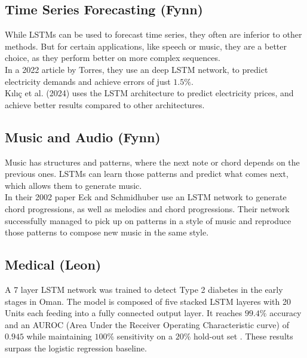 \documentclass[twoside,a4paper,10pt,DIV=12,BCOR=12mm]{scrartcl}
\begin{document}
\subsection{Time Series Forecasting (Fynn)}
While LSTMs can be used to forecast time series, they often are inferior to other methods.\cite{gers2001timeseries} But for certain applications, like speech or music, they are a better choice, as they perform better on more complex sequences.\cite{gers2001timeseries, cahuantzi2023lstmvsgru}\\
In a 2022 article by Torres, they use an deep LSTM network, to predict electricity demands and achieve errors of just \begin{math}1.5\%\end{math}.\cite{torres2022elctricityforecasting}\\
Kılıç et al. (2024) uses the LSTM architecture to predict electricity prices, and achieve better results compared to other architectures.\cite{nielsen2024electricitypriceforcasting}

\subsection{Music and Audio (Fynn)}
Music has structures and patterns, where the next note or chord depends on the previous ones. LSTMs can learn those patterns and predict what comes next, which allows them to generate music.\cite{eck2002musicgeneration}\\
In their 2002 paper Eck and Schmidhuber use an LSTM network to generate chord progressions, as well as melodies and chord progressions. Their network successfully managed to pick up on patterns in a style of music and reproduce those patterns to compose new music in the same style.\cite{eck2002musicgeneration}  

\subsection{Medical (Leon)}

A 7 layer LSTM network was trained to detect Type 2 diabetes in the early stages in Oman. The model is composed of five stacked
LSTM layeres with 20 Units each feeding into a fully connected output layer. It reaches \begin{math}99.4 \%\end{math} accuracy and an 
AUROC (Area Under the Receiver Operating Characteristic curve) of \begin{math}0.945\end{math} while maintaining \begin{math}100 \%\end{math} sensitivity on a \begin{math}20 \%\end{math} hold-out set \cite{AlSadi2024LSTM}.
These results surpass the logistic regression baseline.
\end{document}
